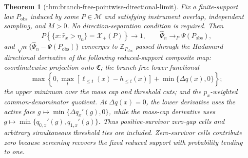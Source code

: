 \documentclass{article}
\newtheorem{theorem}{Theorem}
\begin{document}
\begin{theorem}[thm:branch-free-pointwise-directional-limit]\label{thm:branch-free-pointwise-directional-limit}
Fix a finite-support law \(P_{\mathrm{obs}}\) induced by some \(P\in\mathcal M\) and satisfying instrument overlap, independent sampling, and \(M>0\).  No direction-separation condition is required.  Then
\[
P\!\left\{\{x:\widehat r_x>\eta_n\}=\mathcal X_+(P)\right\}\to1,\qquad
\widehat\Psi_n\to_P\Psi(P_{\mathrm{obs}}),
\]
and \(\sqrt n\{\widehat\Psi_n-\Psi(P_{\mathrm{obs}})\}\) converges to \(\mathbb Z_{P_{\mathrm{obs}}}\) passed through the Hadamard directional derivative of the following reduced-support composite map: coordinatewise projection onto \(\mathfrak C\); the branch-free lower functional
\[
\max\left\{0,\max_t[\ell_{\le t}(x)-h_{\le t}(x)]+\min\{\Delta q(x),0\}\right\};
\]
the upper minimum over the mass cap and threshold cuts; and the \(p_x\)-weighted common-denominator quotient.  At \(\Delta q(x)=0\), the lower derivative uses the active face \(g\mapsto\min\{\Delta q_x'(g),0\}\), while the mass-cap derivative uses \(g\mapsto\min\{q_{0,x}'(g),q_{1,x}'(g)\}\).  Thus positive-survivor zero-gap cells and arbitrary simultaneous threshold ties are included.  Zero-survivor cells contribute zero because screening recovers the fixed reduced support with probability tending to one.
\end{theorem}
\end{document}
